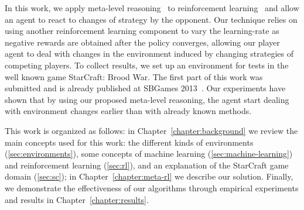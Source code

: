 In this work, we apply meta-level reasoning~\cite{cox2007metareasoning,ulam2008combining} to reinforcement learning~\cite{schweighofer2003meta} and allow an agent to react to changes of strategy by the opponent.
Our technique relies on using another reinforcement learning component to vary the learning-rate as negative rewards are obtained after the policy converges, allowing our player agent to deal with changes in the environment induced by changing strategies of competing players.
To collect results, we set up an environment for tests in the well known game StarCraft: Brood War.
The first part of this work was submitted and is already published at SBGames 2013~\cite{mypaper}.
Our experiments have shown that by using our proposed meta-level reasoning, the agent start dealing with environment changes earlier than with already known methods.

This work is organized as follows: 
in Chapter~\ref{chapter:background} we review the main concepts used for this work:
the different kinds of environments (\ref{sec:environments}), some concepts of machine learning (\ref{sec:machine-learning}) and reinforcement learning (\ref{sec:rl}), and an explanation of the StarCraft game domain (\ref{sec:sc}); 
in Chapter~\ref{chapter:meta-rl} we describe our solution.
Finally, we demonstrate the effectiveness of our algorithms through empirical experiments and results in Chapter~\ref{chapter:results}.